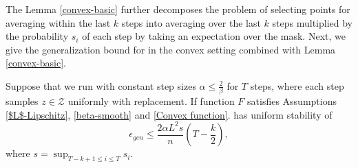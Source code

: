 The Lemma \ref{convex-basic} further decomposes the problem of selecting points for averaging within the last $k$ steps into averaging over the last $k$ steps multiplied by the probability $s_i$ of each step by taking an expectation over the mask. Next, we give the generalization bound for \method{} in the convex setting combined with Lemma \ref{convex-basic}.

\begin{theorem}\label{thm:stability-conv}
Suppose that we run \method{} with constant step sizes $\alpha \leq \frac{2}{\beta}$ for $T$ steps, where each step samples $z \in \mathcal{Z}$ uniformly with replacement. If function $F$ satisfies Assumptions \ref{$L$-Lipschitz}, \ref{beta-smooth} and \ref{Convex function}. \method{} has uniform stability of
\begin{equation}
  \epsilon_{gen} \leq \frac{2\alpha L^2 s}{n} \left(T - \frac{k}{2} \right),
 \end{equation}
where $s=\sup_{T-k+1\leq i\leq T} s_i$.
\end{theorem}

